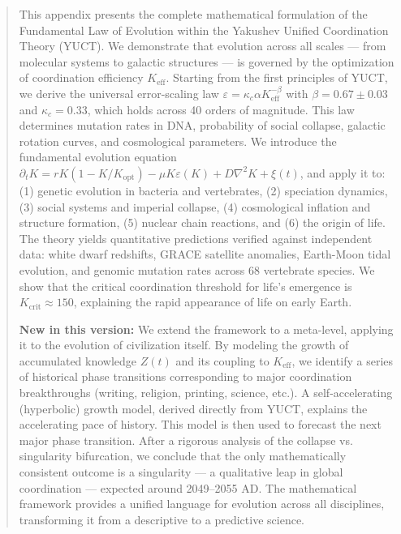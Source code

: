\documentclass[12pt,a4paper]{article}
\theoremstyle{remark}
\newcommand{\Keff}{K_{\mathrm{eff}}}
\newcommand{\kappac}{\kappa_c}
\newcommand{\eps}{\varepsilon}
\begin{document}
\begin{titlepage}
\begin{center}
			\begin{minipage}{0.9\textwidth}
				\begin{abstract}
					\noindent
					This appendix presents the complete mathematical formulation of the Fundamental Law of Evolution within the Yakushev Unified Coordination Theory (YUCT). We demonstrate that evolution across all scales — from molecular systems to galactic structures — is governed by the optimization of coordination efficiency $\Keff$. Starting from the first principles of YUCT, we derive the universal error-scaling law $\eps = \kappac \alpha \Keff^{-\beta}$ with $\beta = 0.67 \pm 0.03$ and $\kappac = 0.33$, which holds across 40 orders of magnitude. This law determines mutation rates in DNA, probability of social collapse, galactic rotation curves, and cosmological parameters. We introduce the fundamental evolution equation $\partial_t K = rK(1-K/K_{\mathrm{opt}}) - \mu K \eps(K) + D\nabla^2 K + \xi(t)$, and apply it to: (1) genetic evolution in bacteria and vertebrates, (2) speciation dynamics, (3) social systems and imperial collapse, (4) cosmological inflation and structure formation, (5) nuclear chain reactions, and (6) the origin of life. The theory yields quantitative predictions verified against independent data: white dwarf redshifts, GRACE satellite anomalies, Earth-Moon tidal evolution, and genomic mutation rates across 68 vertebrate species. We show that the critical coordination threshold for life's emergence is $K_{\mathrm{crit}} \approx 150$, explaining the rapid appearance of life on early Earth. 
					
					\noindent
					\textbf{New in this version:} We extend the framework to a meta-level, applying it to the evolution of civilization itself. By modeling the growth of accumulated knowledge $Z(t)$ and its coupling to $K_{\text{eff}}$, we identify a series of historical phase transitions corresponding to major coordination breakthroughs (writing, religion, printing, science, etc.). A self-accelerating (hyperbolic) growth model, derived directly from YUCT, explains the accelerating pace of history. This model is then used to forecast the next major phase transition. After a rigorous analysis of the collapse vs. singularity bifurcation, we conclude that the only mathematically consistent outcome is a singularity — a qualitative leap in global coordination — expected around 2049–2055 AD. The mathematical framework provides a unified language for evolution across all disciplines, transforming it from a descriptive to a predictive science.
				\end{abstract}
			\end{minipage}
			

\end{center}
\end{titlepage}
\end{document}
